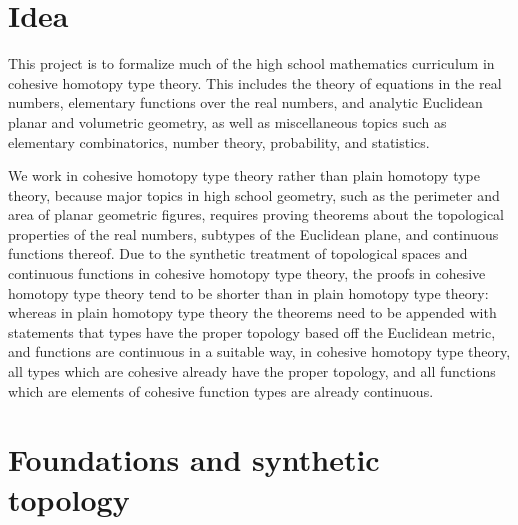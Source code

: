 \documentclass[one]{article}
\begin{document}
\tableofcontents

\section{Idea}

This project is to formalize much of the high school mathematics curriculum in cohesive homotopy type theory. This includes the theory of equations in the real numbers, elementary functions over the real numbers, and analytic Euclidean planar and volumetric geometry, as well as miscellaneous topics such as elementary combinatorics, number theory, probability, and statistics. 

We work in cohesive homotopy type theory rather than plain homotopy type theory, because major topics in high school geometry, such as the perimeter and area of planar geometric figures, requires proving theorems about the topological properties of the real numbers, subtypes of the Euclidean plane, and continuous functions thereof. Due to the synthetic treatment of topological spaces and continuous functions in cohesive homotopy type theory, the proofs in cohesive homotopy type theory tend to be shorter than in plain homotopy type theory: whereas in plain homotopy type theory the theorems need to be appended with statements that types have the proper topology based off the Euclidean metric, and functions are continuous in a suitable way, in cohesive homotopy type theory, all types which are cohesive already have the proper topology, and all functions which are elements of cohesive function types are already continuous. 

\section{Foundations and synthetic topology}
\end{document}

